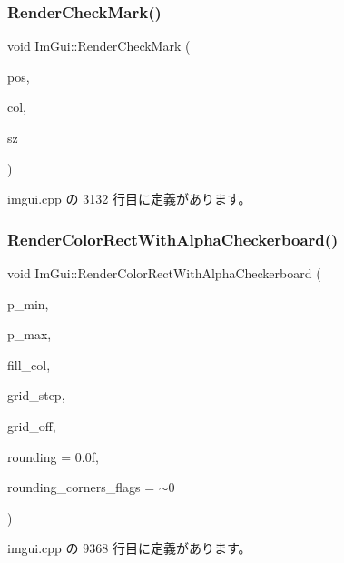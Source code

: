 \subsubsection{\texorpdfstring{Render\+Check\+Mark()}{RenderCheckMark()}}
{\footnotesize\ttfamily void Im\+Gui\+::\+Render\+Check\+Mark (\begin{DoxyParamCaption}\item[{\mbox{\hyperlink{struct_im_vec2}{Im\+Vec2}}}]{pos,  }\item[{\mbox{\hyperlink{imgui_8h_a118cff4eeb8d00e7d07ce3d6460eed36}{Im\+U32}}}]{col,  }\item[{float}]{sz }\end{DoxyParamCaption})}



 imgui.\+cpp の 3132 行目に定義があります。

\mbox{\label{namespace_im_gui_a4715686ee0c613e8518c0f5e92c358ce}} 
\subsubsection{\texorpdfstring{Render\+Color\+Rect\+With\+Alpha\+Checkerboard()}{RenderColorRectWithAlphaCheckerboard()}}
{\footnotesize\ttfamily void Im\+Gui\+::\+Render\+Color\+Rect\+With\+Alpha\+Checkerboard (\begin{DoxyParamCaption}\item[{\mbox{\hyperlink{struct_im_vec2}{Im\+Vec2}}}]{p\+\_\+min,  }\item[{\mbox{\hyperlink{struct_im_vec2}{Im\+Vec2}}}]{p\+\_\+max,  }\item[{\mbox{\hyperlink{imgui_8h_a118cff4eeb8d00e7d07ce3d6460eed36}{Im\+U32}}}]{fill\+\_\+col,  }\item[{float}]{grid\+\_\+step,  }\item[{\mbox{\hyperlink{struct_im_vec2}{Im\+Vec2}}}]{grid\+\_\+off,  }\item[{float}]{rounding = {\ttfamily 0.0f},  }\item[{int}]{rounding\+\_\+corners\+\_\+flags = {\ttfamily $\sim$0} }\end{DoxyParamCaption})}



 imgui.\+cpp の 9368 行目に定義があります。

